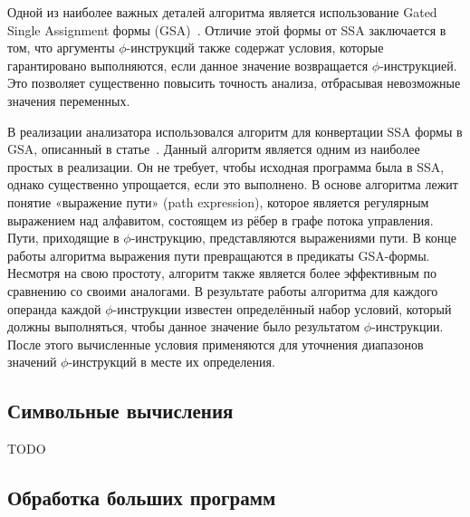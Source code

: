 Одной из наиболее важных деталей алгоритма является использование
Gated Single Assignment формы
(GSA)~\cite{ottenstein1990program}. Отличие этой формы от SSA
заключается в том, что аргументы $\phi$-инструкций также содержат
условия, которые гарантировано выполняются, если данное значение
возвращается $\phi$-инструкцией. Это позволяет существенно повысить
точность анализа, отбрасывая невозможные значения переменных.

В реализации анализатора использовался алгоритм для конвертации SSA
формы в GSA, описанный в статье~\cite{tu1995efficient}. Данный
алгоритм является одним из наиболее простых в реализации. Он не
требует, чтобы исходная программа была в SSA, однако существенно
упрощается, если это выполнено. В основе алгоритма лежит понятие
«выражение пути» (path expression), которое является регулярным
выражением над алфавитом, состоящем из рёбер в графе потока
управления. Пути, приходящие в $\phi$-инструкцию, представляются
выражениями пути. В конце работы алгоритма выражения пути превращаются
в предикаты GSA-формы. Несмотря на свою простоту, алгоритм также
является более эффективным по сравнению со своими аналогами. В
результате работы алгоритма для каждого операнда каждой
$\phi$-инструкции известен определённый набор условий, который должны
выполняться, чтобы данное значение было результатом
$\phi$-инструкции. После этого вычисленные условия применяются для
уточнения диапазонов значений $\phi$-инструкций в месте их определения.

\subsection{Символьные вычисления}

TODO

\subsection{Обработка больших программ}

